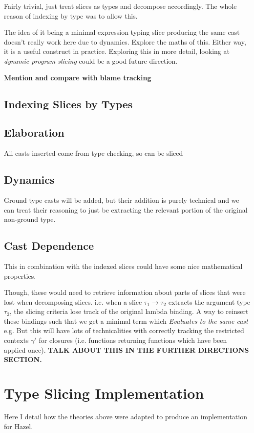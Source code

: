 Fairly trivial, just treat slices as types and decompose accordingly. The whole reason of indexing by type was to allow this.

The idea of it being a minimal expression typing slice producing the same cast doesn't really work here due to dynamics. Explore the maths of this. Either way, it is a useful construct in practice. Exploring this in more detail, looking at \textit{dynamic program slicing} could be a good future direction.

\textbf{Mention and compare with blame tracking}

\subsection{Indexing Slices by Types}


\subsection{Elaboration}
All casts inserted come from type checking, so can be sliced

\subsection{Dynamics}
Ground type casts will be added, but their addition is purely technical and we can treat their reasoning to just be extracting the relevant portion of the original non-ground type.

\subsection{Cast Dependence}
This in combination with the indexed slices could have some nice mathematical properties.

Though, these would need to retrieve information about parts of slices that were lost when decomposing slices. i.e. when a slice $\tau_1 \to \tau_2$ extracts the argument type $\tau_2$, the slicing criteria lose track of the original lambda binding. A way to reinsert these bindings such that we get a minimal term which \textit{Evaluates to the same cast} e.g. But this will have lots of technicalities with correctly tracking the restricted contexts $\gamma'$ for closures (i.e. functions returning functions which have been applied once). \textbf{TALK ABOUT THIS IN THE FURTHER DIRECTIONS SECTION.}

\section{Type Slicing Implementation}\label{sec:TypeSlicingImplementation}
Here I detail how the theories above were adapted to produce an implementation for Hazel.
